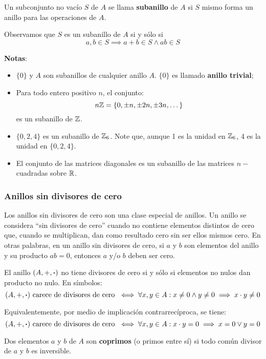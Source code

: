 \begin{fmd-definition}[Subanillo]
	Un subconjunto no vacío $S$ de $A$ se llama \textbf{subanillo} de $A$ si $S$ mismo forma un anillo para las operaciones de $A$.
	
	Observamos que $S$ es un subanillo de $A$ si y sólo si
	\[ a, b \in S \implies a + b \in S \land ab \in S\] 
\end{fmd-definition}

\textbf{Notas}:
\begin{itemize}
	\item $\{0\}$ y $A$ son subanillos de cualquier anillo $A$. $\{0\}$ es llamado \textbf{anillo trivial};
	\item Para todo entero positivo $n$, el conjunto:
	\[n\mathbb{Z} = \{0, \pm n, \pm 2n, \pm 3n, \dots\}\]
	es un subanillo de $\mathbb{Z}$.
	\item $\{0, 2, 4\}$ es un subanillo de $\mathbb{Z}_6$. Note que, aunque 1 es la unidad en $\mathbb{Z}_6$, 4 es la unidad en $\{0, 2, 4\}$.
	\item El conjunto de las matrices diagonales es un subanillo de las matrices $n-$cuadradas sobre $\mathbb{R}$.
\end{itemize}

\subsubsection{Anillos sin divisores de cero}
Los anillos sin divisores de cero son una clase especial de anillos. Un anillo se considera ``sin divisores de cero'' cuando no contiene elementos distintos de cero que, cuando se multiplican, dan como resultado cero sin ser ellos mismos cero. En otras palabras, en un anillo sin divisores de cero, si $a$ y $b$ son elementos del anillo y su producto $a b = 0$, entonces $a$ y/o $b$ deben ser cero.

\begin{fmd-definition}
	El anillo $(A, +, \boldsymbol{\cdot})$ no tiene divisores de cero si y sólo si elementos no nulos dan producto no nulo. En símbolos:
	\[ (A, +, \boldsymbol{\cdot}) \mbox{ carece de divisores de cero } \iff \forall x, y \in A: x \ne 0 \land y \ne 0 \implies x \cdot y \ne 0 \]
	
	Equivalentemente, por medio de implicación contrarrecíproca, se tiene:
	\[ (A, +, \boldsymbol{\cdot}) \mbox{ carece de divisores de cero } \iff \forall x, y \in A: x \cdot y = 0 \implies x = 0 \lor y = 0 \]
\end{fmd-definition}

\begin{fmd-definition}[Coprimos]
	Dos elementos $a$ y $b$ de $A$ son \textbf{coprimos} (o primos entre sí) si todo común divisor de $a$ y $b$ es inversible.
\end{fmd-definition}

